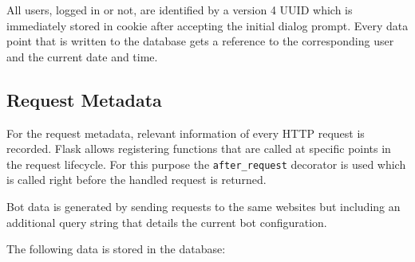 \documentclass[
    fontsize=12pt,
    headings=small,
    parskip=half,           %
    bibliography=totoc,
    numbers=noenddot,       %
    open=any,               %
    final,                   %
    table
]{scrreprt}
\renewcommand{\arraystretch}{1.2}
\begin{document}
All users, logged in or not, are identified by a version 4 UUID which is immediately stored in cookie after accepting the initial dialog prompt. Every data point that is written to the database gets a reference to the corresponding user and the current date and time.

\subsection{Request Metadata}

For the request metadata, relevant information of every HTTP request is recorded. Flask allows registering functions that are called at specific points in the request lifecycle. For this purpose the \lstinline{after_request} decorator is used which is called right before the handled request is returned.

Bot data is generated by sending requests to the same websites but including an additional query string that details the current bot configuration.

The following data is stored in the database:

\renewcommand{\arraystretch}{1.2}
\end{document}
